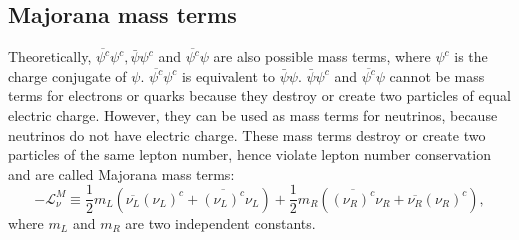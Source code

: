 \subsection{Majorana mass terms}
\label{sec:major}
Theoretically, $\overline{\psi^{c}}\psi^{c}, \bar{\psi}\psi^{c}$ and $\overline{\psi^{c}}\psi$ are also possible mass terms, where $\psi^{c}$ is the charge conjugate of $\psi$. $\overline{\psi^{c}} \psi^{c}$ is equivalent to $\bar{\psi}\psi$. $\bar{\psi}\psi^{c}$ and $\overline{\psi^{c}}\psi$ cannot be mass terms for electrons or quarks because they destroy or create two particles of equal electric charge. However, they can be used as mass terms for neutrinos, because neutrinos do not have electric charge. These mass terms destroy or create two particles of the same lepton number, hence violate lepton number conservation and are called Majorana mass terms:
\begin{equation}
  \label{eq:mmt}
  -\mathcal{L}_{\nu}^{M} \equiv \frac{1}{2}m_{L} \left(
    \overline{\nu_{L}}(\nu_{L})^{c} +                  \overline{(\nu_{L})^{c}}\nu_{L}
  \right) + \frac{1}{2}m_{R} \left(
    \overline{(\nu_{R})^{c}}\nu_{R} +                       \overline{\nu_{R}}(\nu_{R})^{c} \right),
\end{equation}
where $m_{L}$ and $m_{R}$ are two independent constants. 

